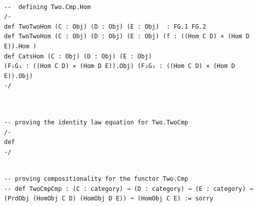 \documentclass{book}
\newcounter{lcounter}
\begin{document}
\begin{center}
\begin{tcolorbox}[width=5in,colback={white},title={\begin{center}\texttt{Lean \thelcounter} \addtocounter{lcounter}{1}  \end{center}},colbacktitle=Blue,coltitle=black]
\begin{verbatim}

--  defining Two.Cmp.Hom
/-
def TwoTwoHom (C : Obj) (D : Obj) (E : Obj)  : FG.1 FG.2
def TwoTwoHom (C : Obj) (D : Obj) (E : Obj) (f : ((Hom C D) ⨯ (Hom D E)).Hom )
def CatsHom (C : Obj) (D : Obj) (E : Obj) 
(F₁G₁ : ((Hom C D) ⨯ (Hom D E)).Obj) (F₂G₂ : ((Hom C D) ⨯ (Hom D E)).Obj)
-/


\end{verbatim}%
\end{tcolorbox}
\end{center}


\begin{center}
\begin{tcolorbox}[width=5in,colback={white},title={\begin{center}\texttt{Lean \thelcounter} \addtocounter{lcounter}{1}  \end{center}},colbacktitle=Blue,coltitle=black]
\begin{verbatim}

-- proving the identity law equation for Two.TwoCmp
/-
def 
-/

\end{verbatim}%
\end{tcolorbox}
\end{center}


\begin{center}
\begin{tcolorbox}[width=5in,colback={white},title={\begin{center}\texttt{Lean \thelcounter} \addtocounter{lcounter}{1}  \end{center}},colbacktitle=Blue,coltitle=black]
\begin{verbatim}

-- proving compositionality for the functor Two.Cmp
-- def TwoCmpCmp : (C : category) → (D : category) → (E : category) → (PrdObj (HomObj C D) (HomObj D E)) ➞ (HomObj C E) := sorry

\end{verbatim}%
\end{tcolorbox}
\end{center}
\end{document}
